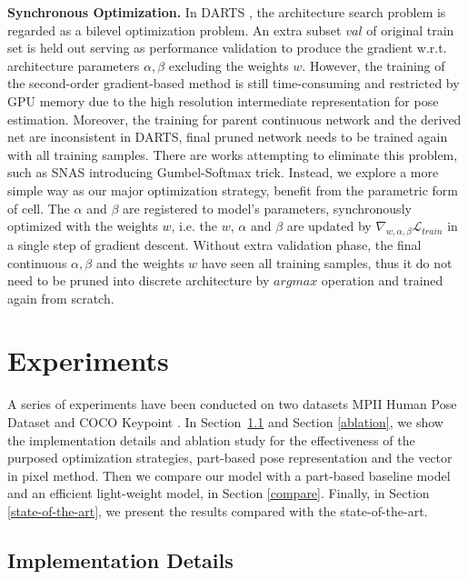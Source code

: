 \documentclass[journal]{IEEEtran}
\begin{document}
\textbf{Synchronous Optimization.} In DARTS \cite{liu2018darts}, the architecture search problem is regarded as a bilevel optimization problem. An extra subset $val$ of original train set is held out serving as performance validation to produce the gradient w.r.t. architecture parameters $\alpha,\beta$ excluding the weights $w$. However, the training of the second-order gradient-based method is still time-consuming and restricted by GPU memory due to the high resolution intermediate representation for pose estimation. Moreover, the training for parent continuous network and the derived net are inconsistent  in DARTS, final pruned network needs to be trained again with all training samples.  There are works attempting to eliminate this problem, such as SNAS \cite{xie2018snas} introducing Gumbel-Softmax trick. Instead, we explore a more simple way as our major optimization strategy, benefit from the parametric form of cell. The $\alpha $ and $\beta$ are registered to model's parameters, synchronously optimized with the weights $w$, i.e. the $w$, $\alpha $ and $\beta$ are updated by $\nabla_{w,\alpha,\beta}\mathcal{L}_{train}$ in a single step of gradient descent. Without extra validation phase, the final continuous $\alpha,\beta$ and the weights $w$ have seen all training samples, thus it do not need to be pruned into discrete architecture by $argmax$ operation and trained again from scratch.

\section{Experiments}


A series of experiments have been conducted on two datasets MPII Human Pose Dataset \cite{andriluka20142d} and COCO Keypoint \cite{lin2014microsoft}. In Section~\ref{implement} and Section \ref{ablation}, we show the implementation details and ablation study for the effectiveness of the purposed optimization strategies, part-based pose representation and the vector in pixel method. Then we compare our model with a part-based baseline model and an efficient light-weight model, in Section \ref{compare}. Finally, in Section \ref{state-of-the-art}, we present the results compared with the state-of-the-art.

\subsection{Implementation Details}
\label{implement}
\end{document}

